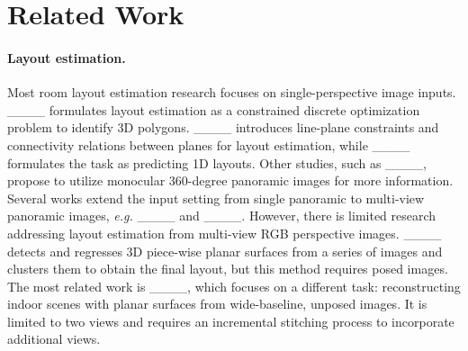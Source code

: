 \section{Related Work}

\paragraph{Layout estimation.}
Most room layout estimation research focuses on single-perspective image inputs. ____ formulates layout estimation as a constrained discrete optimization problem to identify 3D polygons. ____ introduces line-plane constraints and connectivity relations between planes for layout estimation, while ____ formulates the task as predicting 1D layouts.  
Other studies, such as ____, propose to utilize monocular 360-degree panoramic images for more information.
Several works extend the input setting from single panoramic to multi-view panoramic images, \textit{e.g.} ____ and ____.
However, there is limited research addressing layout estimation from multi-view RGB perspective images. ____ detects and regresses 3D piece-wise planar surfaces from a series of images and clusters them to obtain the final layout, but this method requires posed images. The most related work is ____, which focuses on a different task: reconstructing indoor scenes with planar surfaces from wide-baseline, unposed images. It is limited to two views and requires an incremental stitching process to incorporate additional views.

